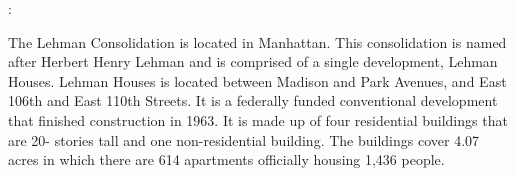 :     

   

The Lehman Consolidation is located in Manhattan. This consolidation is named after Herbert Henry Lehman and is comprised of a single development, Lehman Houses. Lehman Houses is located between Madison and Park Avenues, and East 106th and East 110th Streets. It is a federally funded conventional development that finished construction in 1963. It is made up of four residential buildings that are 20- stories tall and one non-residential building. The buildings cover 4.07 acres in which there are 614 apartments officially housing 1,436 people. 